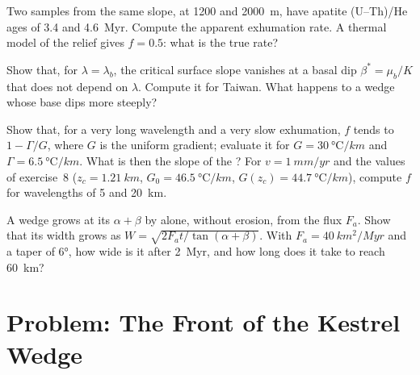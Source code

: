 \begin{exercise}[$\star\star$]\label{exo:b3:orogenic-wedges:9}
Two samples from the same slope, at 1200 and \qty{2000}{m}, have apatite
(U--Th)/He ages of 3.4 and \qty{4.6}{Myr}. Compute the apparent exhumation
rate. A thermal model of the relief gives $f = 0.5$: what is the true rate?
\end{exercise}

\begin{exercise}[$\star\star\star$]\label{exo:b3:orogenic-wedges:10}
Show that, for $\lambda = \lambda_b$, the critical surface slope vanishes at a
basal dip $\beta^* = \mu_b/K$ that does not depend on $\lambda$. Compute it for
Taiwan. What happens to a wedge whose base dips more steeply?
\end{exercise}

\begin{exercise}[$\star\star\star$]\label{exo:b3:orogenic-wedges:11}
Show that, for a very long wavelength and a very slow exhumation, $f$ tends to
$1 - \Gamma/G$, where $G$ is the uniform gradient; evaluate it for $G =
\qty{30}{\celsius/km}$ and $\Gamma = \qty{6.5}{\celsius/km}$. What is then the
slope of the ? For $v = \qty{1}{mm/yr}$ and the
values of exercise~8 ($z_c = \qty{1.21}{km}$, $G_0 = \qty{46.5}{\celsius/km}$,
$G(z_c) = \qty{44.7}{\celsius/km}$), compute $f$ for wavelengths of 5 and
\qty{20}{km}.
\end{exercise}

\begin{exercise}[$\star\star\star$]\label{exo:b3:orogenic-wedges:12}
A wedge grows at its  $\alpha + \beta$ by 
alone, without erosion, from the flux $F_a$. Show that its width grows as
$W = \sqrt{2F_at/\tan(\alpha + \beta)}$. With $F_a = \qty{40}{km^2/Myr}$ and
a taper of \ang{6}, how wide is it after \qty{2}{Myr}, and how long does it
take to reach \qty{60}{km}?
\end{exercise}

\section{Problem: The Front of the Kestrel Wedge}

